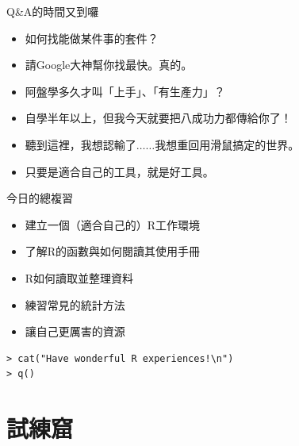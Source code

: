 \documentclass[14pt, aspectratio=43]{beamer}
\begin{document}
\begin{frame}[fragile]{Q\&A的時間又到囉}
\begin{itemize}
\item[Q] 如何找能做某件事的套件？
\item[A] 請Google大神幫你找最快。真的。
\end{itemize}
\begin{itemize}
\item[Q] 阿盤學多久才叫「上手」、「有生產力」？
\item[A] 自學半年以上，但我今天就要把八成功力都傳給你了！
\end{itemize}
\begin{itemize}\item[Q] 聽到這裡，我想認輸了$\ldots\ldots$我想重回用滑鼠搞定的世界。
\item[A] 只要是適合自己的工具，就是好工具。
\end{itemize}
\end{frame}

\begin{frame}[fragile]{今日的總複習}
\begin{itemize}
\item 建立一個（適合自己的）R工作環境
\item 了解R的函數與如何閱讀其使用手冊
\item R如何讀取並整理資料
\item 練習常見的統計方法
\item 讓自己更厲害的資源
\end{itemize}

\large
\begin{verbatim}
> cat("Have wonderful R experiences!\n")
> q()
\end{verbatim}

\end{frame}



\section{試練窟}\subsection{}
\end{document}
